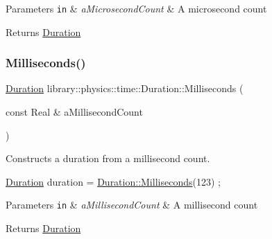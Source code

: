\begin{DoxyParams}[1]{Parameters}
\mbox{\tt in}  & {\em a\+Microsecond\+Count} & A microsecond count \\
\hline
\end{DoxyParams}
\begin{DoxyReturn}{Returns}
\hyperlink{classlibrary_1_1physics_1_1time_1_1_duration}{Duration} 
\end{DoxyReturn}
\mbox{\label{classlibrary_1_1physics_1_1time_1_1_duration_ab6eab798898a96019a8c944cd565e161}} 
\subsubsection{\texorpdfstring{Milliseconds()}{Milliseconds()}}
{\footnotesize\ttfamily \hyperlink{classlibrary_1_1physics_1_1time_1_1_duration}{Duration} library\+::physics\+::time\+::\+Duration\+::\+Milliseconds (\begin{DoxyParamCaption}\item[{const Real \&}]{a\+Millisecond\+Count }\end{DoxyParamCaption})\hspace{0.3cm}{\ttfamily [static]}}



Constructs a duration from a millisecond count. 


\begin{DoxyCode}
\hyperlink{classlibrary_1_1physics_1_1time_1_1_duration_a0a70efcf487a841da572afcf00001f64}{Duration} duration = \hyperlink{classlibrary_1_1physics_1_1time_1_1_duration_ab6eab798898a96019a8c944cd565e161}{Duration::Milliseconds}(123) ;
\end{DoxyCode}



\begin{DoxyParams}[1]{Parameters}
\mbox{\tt in}  & {\em a\+Millisecond\+Count} & A millisecond count \\
\hline
\end{DoxyParams}
\begin{DoxyReturn}{Returns}
\hyperlink{classlibrary_1_1physics_1_1time_1_1_duration}{Duration} 
\end{DoxyReturn}
\mbox{\label{classlibrary_1_1physics_1_1time_1_1_duration_ad7171befa3075e796bfb02a7542dacdd}} 
